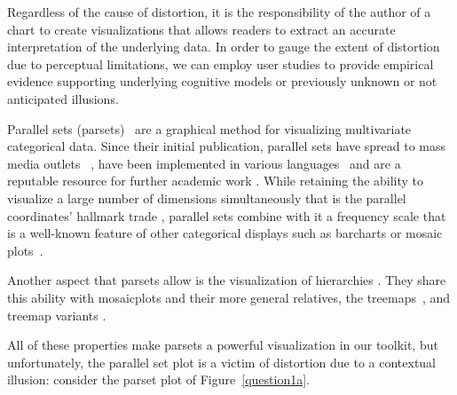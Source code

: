 \documentclass[journal]{vgtc}\usepackage{graphicx, color}
\begin{document}
Regardless of the cause of distortion, it is the responsibility of the  author of a chart to create visualizations that
 allows readers to extract an accurate interpretation of the underlying data.  In order to gauge the
extent of distortion due to perceptual limitations, we can employ user studies   to provide empirical evidence supporting 
underlying cognitive models or previously unknown or not anticipated illusions.




Parallel sets (parsets)~\citep{kosara:2006} are a graphical method  for visualizing multivariate categorical data. Since their initial publication, parallel sets have spread to mass media outlets ~\citep{eagereyes, bostock:2012, bbc:2009}, have been implemented in various languages~\citep{eagereyes, d3, davies} and are a reputable resource for further academic work \citep[][has 70 citations according to Google scholar]{kosara:2006}. While retaining the %
ability to visualize a large number of dimensions simultaneously that is the parallel coordinates' hallmark trade \cite{inselberg:1985, wegman:1990}, parallel sets combine with it a frequency scale that is a well-known feature of other categorical displays such as barcharts or mosaic plots~\citep{hartigan:1981, friendly:1992, hofmann:2000, theus:1997}. 

Another aspect that parsets allow is the visualization of hierarchies \citep{slingsby:2009, stasko:2000}. They share this ability with mosaicplots and their more general relatives, the treemaps~\citep{shneiderman:1992}, and treemap variants  \citep{bruls:1999, kong:2010, balzer:2005}.


All of these properties make parsets a powerful visualization  in our toolkit, but 
unfortunately, the parallel set plot is a victim of distortion due to a contextual illusion: consider the parset plot of Figure~\ref{question1a}.
%
\end{document}
